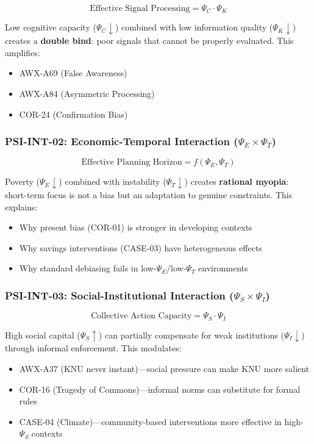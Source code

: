 \begin{equation}
\text{Effective Signal Processing} = \Psi_C \cdot \Psi_K
\end{equation}

Low cognitive capacity ($\Psi_C \downarrow$) combined with low information quality ($\Psi_K \downarrow$) creates a \textbf{double bind}: poor signals that cannot be properly evaluated. This amplifies:
\begin{itemize}
    \item AWX-A69 (False Awareness)
    \item AWX-A84 (Asymmetric Processing)
    \item COR-24 (Confirmation Bias)
\end{itemize}

\subsubsection{PSI-INT-02: Economic-Temporal Interaction ($\Psi_E \times \Psi_T$)}

\begin{equation}
\text{Effective Planning Horizon} = f(\Psi_E, \Psi_T)
\end{equation}

Poverty ($\Psi_E \downarrow$) combined with instability ($\Psi_T \downarrow$) creates \textbf{rational myopia}: short-term focus is not a bias but an adaptation to genuine constraints. This explains:
\begin{itemize}
    \item Why present bias (COR-01) is stronger in developing contexts
    \item Why savings interventions (CASE-03) have heterogeneous effects
    \item Why standard debiasing fails in low-$\Psi_E$/low-$\Psi_T$ environments
\end{itemize}

\subsubsection{PSI-INT-03: Social-Institutional Interaction ($\Psi_S \times \Psi_I$)}

\begin{equation}
\text{Collective Action Capacity} = \Psi_S \cdot \Psi_I
\end{equation}

High social capital ($\Psi_S \uparrow$) can partially compensate for weak institutions ($\Psi_I \downarrow$) through informal enforcement. This modulates:
\begin{itemize}
    \item AWX-A37 (KNU never instant)---social pressure can make KNU more salient
    \item COR-16 (Tragedy of Commons)---informal norms can substitute for formal rules
    \item CASE-04 (Climate)---community-based interventions more effective in high-$\Psi_S$ contexts
\end{itemize}

